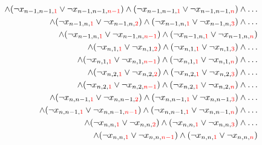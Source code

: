\documentclass[11pt, a4paper]{article}
\begin{document}
\begin{align*}
		\wedge
		(\neg x_{n-1,n-1,{\color{red} 1}} \vee \neg x_{n-1,n-1,{\color{red} n-1}})
		\wedge
		(\neg x_{n-1,n-1,{\color{red} 1}} \vee \neg x_{n-1,n-1,{\color{red} n}})
		\wedge \dots \\
		\wedge
		(\neg x_{n-1,n,{\color{red} 1}} \vee \neg x_{n-1,n,{\color{red} 2}}) 
		\wedge 
		(\neg x_{n-1,n,{\color{red} 1}} \vee \neg x_{n-1,n,{\color{red} 3}})
		\wedge \dots \\
		\wedge
		(\neg x_{n-1,n,{\color{red} 1}} \vee \neg x_{n-1,n,{\color{red} n-1}})
		\wedge
		(\neg x_{n-1,n,{\color{red} 1}} \vee \neg x_{n-1,n,{\color{red} n}})
		\\
		\wedge (\neg x_{n,1,{\color{red} 1}} \vee \neg x_{n,1,{\color{red} 2}}) 
		\wedge 
		(\neg x_{n,1,{\color{red} 1}} \vee \neg x_{n,1,{\color{red} 3}})
		\wedge \dots \\
		\wedge
		(\neg x_{n,1,{\color{red} 1}} \vee \neg x_{n,1,{\color{red} n-1}})
		\wedge
		(\neg x_{n,1,{\color{red} 1}} \vee \neg x_{n,1,{\color{red} n}})
		\wedge \dots \\
		\wedge
		(\neg x_{n,2,{\color{red} 1}} \vee \neg x_{n,2,{\color{red} 2}}) 
		\wedge 
		(\neg x_{n,2,{\color{red} 1}} \vee \neg x_{n,2,{\color{red} 3}})
		\wedge \dots \\
		\wedge
		(\neg x_{n,2,{\color{red} 1}} \vee \neg x_{n,2,{\color{red} n-1}})
		\wedge
		(\neg x_{n,2,{\color{red} 1}} \vee \neg x_{n,2,{\color{red} n}})
		\wedge \dots \\
		\wedge
		(\neg x_{n,n-1,{\color{red} 1}} \vee \neg x_{n,n-1,{\color{red} 2}}) 
		\wedge 
		(\neg x_{n,n-1,{\color{red} 1}} \vee \neg x_{n,n-1,{\color{red} 3}})
		\wedge \dots \\
		\wedge
		(\neg x_{n,n-1,{\color{red} 1}} \vee \neg x_{n,n-1,{\color{red} n-1}})
		\wedge
		(\neg x_{n,n-1,{\color{red} 1}} \vee \neg x_{n,n-1,{\color{red} n}})
		\wedge \dots \\
		\wedge
		(\neg x_{n,n,{\color{red} 1}} \vee \neg x_{n,n,{\color{red} 2}}) 
		\wedge 
		(\neg x_{n,n,{\color{red} 1}} \vee \neg x_{n,n,{\color{red} 3}})
		\wedge \dots \\
		\wedge
		(\neg x_{n,n,{\color{red} 1}} \vee \neg x_{n,n,{\color{red} n-1}})
		\wedge
		(\neg x_{n,n,{\color{red} 1}} \vee \neg x_{n,n,{\color{red} n}})
	\end{align*}
	\bigskip
		
\end{document}
